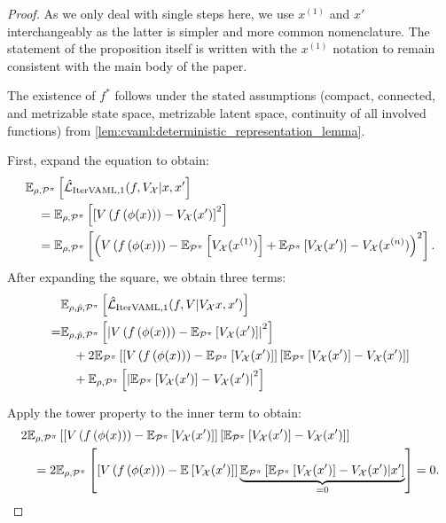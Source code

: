 \begin{proof}

As we only deal with single steps here, we use $x^{(1)}$ and $x'$ interchangeably as the latter is simpler and more common nomenclature.
The statement of the proposition itself is written with the $x^{(1)}$ notation to remain consistent with the main body of the paper.

The existence of $f^*$ follows under the stated assumptions (compact, connected, and metrizable state space, metrizable latent space, continuity of all involved functions) from \autoref{lem:cvaml:deterministic_representation_lemma}.

First, expand the equation to obtain:
\begin{align}
     &\mathbb{E}_{\rho,\mathcal{P}^\pi}\left[  \hat{\mathcal{L}}_{\text{IterVAML}, 1}(f, V_\mathcal{X} | x, x'  \right] \\
    &\quad = \mathbb{E}_{\rho,\mathcal{P}^\pi}\left[  \left[ V\left( f\left( \phi(x) \right) \right) - V_\mathcal{X}(x') \right]^2 \right]\\
    &\quad = \mathbb{E}_{\rho,\mathcal{P}^\pi}\left[  \Bigl(V\left( f\left( \phi(x) \right) \right) - \mathbb{E}_{\mathcal{P}^\pi}\left[  V_\mathcal{X}(x^{(1)}) \right] + \mathbb{E}_{\mathcal{P}^\pi}\left[  V_\mathcal{X}(x') \right] - V_\mathcal{X}(x^{(n)}) \Bigr)^2 \right].
\end{align}
After expanding the square, we obtain three terms:
\begin{align}
    & \mathbb{E}_{\rho,\hat{p},\mathcal{P}^\pi}\left[  \hat{\mathcal{L}}_{\text{IterVAML}, 1}(f, V | V_\mathcal{X} x, x')  \right] \\
    = &\mathbb{E}_{\rho,\hat{p},\mathcal{P}^\pi}\left[  \left|{V\left( f\left( \phi(x) \right) \right) - \mathbb{E}_{\mathcal{P}^\pi}\left[  V_\mathcal{X}(x') \right]}\right|^2 \right] \\
    &\quad + 2 \mathbb{E}_{\mathcal{P}^\pi}\left[  \left[ V\left( f\left( \phi(x) \right) \right) - \mathbb{E}_{\mathcal{P}^\pi}\left[  V_\mathcal{X}(x') \right] \right]\left[ \mathbb{E}_{\mathcal{P}^\pi}\left[  V_\mathcal{X}(x') \right] - V_\mathcal{X}(x')  \right] \right]\\
    &\quad + \mathbb{E}_{\rho,\mathcal{P}^\pi}\left[  \left|{\mathbb{E}_{\mathcal{P}^\pi}\left[  V_\mathcal{X}(x') \right] - V_\mathcal{X}(x') }\right|^2 \right]
\end{align}

Apply the tower property to the inner term to obtain: 
\begin{align}
&2\mathbb{E}_{\rho,\mathcal{P}^\pi}\left[  \left[ V\left( f\left( \phi(x) \right) \right) - \mathbb{E}_{\mathcal{P}^\pi}\left[  V_\mathcal{X}(x') \right] \right]\left[ \mathbb{E}_{\mathcal{P}^\pi}\left[  V_\mathcal{X}(x') \right] - V_\mathcal{X}(x')  \right] \right]\\
&\quad =2\mathbb{E}_{\rho,\mathcal{P}^\pi}\left[  \left[ V\left( f\left( \phi(x) \right) \right) - \mathbb{E}_{}\left[  V_\mathcal{X}(x') \right] \right]\underbrace{\mathbb{E}_{\mathcal{P}^\pi}\left[  \mathbb{E}_{\mathcal{P}^\pi}\left[  V_\mathcal{X}(x') \right] - V_\mathcal{X}(x') \middle|x' \right]}_{=0} \right] = 0.
\end{align}


\end{proof}
